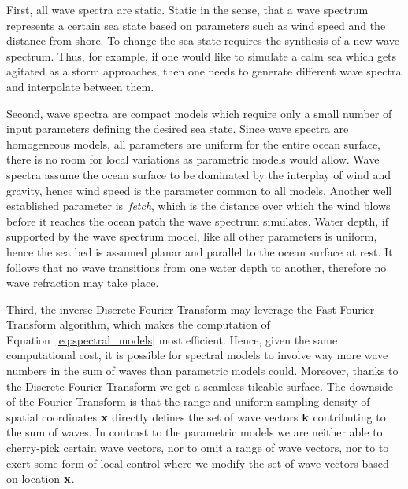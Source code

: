 First, all wave spectra
are static. Static in the sense, that a wave spectrum represents a certain sea
state based on parameters such as wind speed and the distance from shore. To
change the sea state requires the synthesis of a new wave spectrum. Thus, for
example, if one would like to simulate a calm sea which gets agitated as a storm
approaches, then one needs to generate different wave spectra and interpolate
between them.

Second, wave spectra are compact models which require only a small
number of input parameters defining the desired sea state. Since wave spectra
are homogeneous models, all parameters are uniform for the entire ocean surface,
there is no room for local variations as parametric models would allow. Wave
spectra assume the ocean surface to be dominated by the interplay of wind and
gravity, hence wind speed is the parameter common to all models. Another well
established parameter is~\emph{fetch}, which is the distance over which the wind
blows before it reaches the ocean patch the wave spectrum simulates. Water
depth, if supported by the wave spectrum model, like all other parameters is
uniform, hence the sea bed is assumed planar and parallel to the ocean surface
at rest. It follows that no wave transitions from one water depth to another,
therefore no wave refraction may take place.

Third, the inverse Discrete Fourier Transform may leverage the
Fast Fourier Transform algorithm, which makes the computation of
Equation~\ref{eq:spectral_models} most efficient. Hence, given the same
computational cost, it is possible for spectral models to involve way more wave
numbers in the sum of waves than parametric models could. Moreover, thanks to
the Discrete Fourier Transform we get a seamless tileable surface.
The downside of the Fourier Transform is that the range and uniform sampling
density of spatial coordinates $\mathbf{x}$ directly defines the set of wave
vectors $\mathbf{k}$ contributing to the sum of waves. In contrast to the
parametric models we are neither able to cherry-pick certain wave vectors,
nor to omit a range of wave vectors, nor to to exert some form of local control
where we modify the set of wave vectors based on location $\mathbf{x}$.\\

